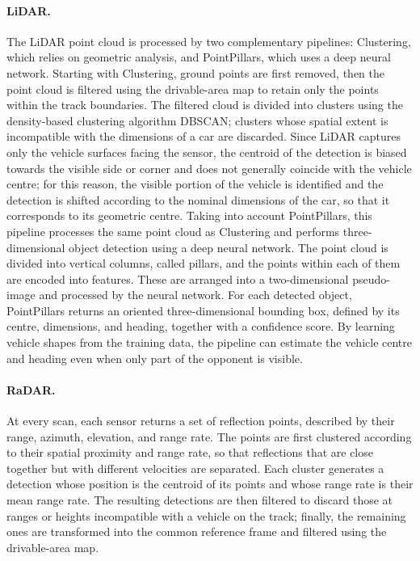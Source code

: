 \paragraph{LiDAR.} The LiDAR point cloud is processed by two complementary pipelines:
Clustering, which relies on geometric analysis, and PointPillars, which uses a deep neural
network. Starting with Clustering, ground points are first removed, then the point cloud is filtered
using the drivable-area map to retain only the points within the track boundaries. The
filtered cloud is divided into clusters using the density-based clustering algorithm DBSCAN; clusters whose spatial extent is incompatible with the dimensions of a car are
discarded. Since LiDAR captures only the vehicle surfaces facing the sensor, the centroid of
the detection is biased towards the visible side or corner and does not generally coincide
with the vehicle centre; for this reason, the visible portion of the vehicle is identified
and the detection is shifted according to the nominal dimensions of the car, so that it
corresponds to its geometric centre. Taking into account PointPillars, this pipeline
processes the same point cloud as Clustering and performs three-dimensional object detection
using a deep neural network. The point cloud is divided into vertical columns, called
pillars, and the points within each of them are encoded into features. These are arranged into a two-dimensional pseudo-image and processed by the neural
network. For each detected object, PointPillars returns an oriented three-dimensional
bounding box, defined by its centre, dimensions, and heading, together with a confidence
score. By learning vehicle shapes from the training data, the pipeline can estimate the
vehicle centre and heading even when only part of the opponent is visible.

\paragraph{RaDAR.} At every scan, each sensor returns a set of reflection points,
described by their range, azimuth, elevation, and range rate. The points are first clustered
according to their spatial proximity and range rate, so that reflections that are close
together but with different velocities are separated. Each cluster generates a detection
whose position is the centroid of its points and whose range rate is their mean range rate.
The resulting detections are then filtered to discard those at ranges or heights
incompatible with a vehicle on the track; finally, the remaining ones are transformed into
the common reference frame and filtered using the drivable-area map.

